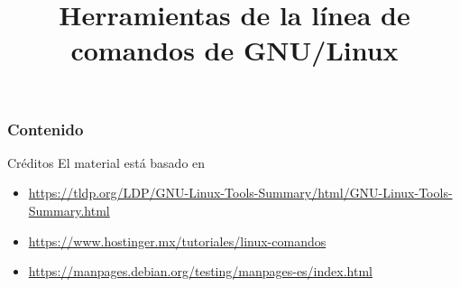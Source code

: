 \documentclass[aspectratio=169]{beamer}
\title[Línea de comandos de Linux]{Herramientas de la línea de comandos de GNU/Linux}
\newcommand{\nologo}{\setbeamertemplate{logo}{}} %
\newcommand{\nologo}{\setbeamertemplate{logo}{}} %
\begin{document}
{
\nologo
\begin{frame}
    \titlepage
\end{frame}
}

\begin{frame}
    \frametitle{Contenido}
    \tableofcontents
\end{frame}



\begin{frame}[c]{Créditos}
  El material está basado en
  \begin{itemize}
    \item \href{https://tldp.org/LDP/GNU-Linux-Tools-Summary/html/GNU-Linux-Tools-Summary.html}{https://tldp.org/LDP/GNU-Linux-Tools-Summary/html/GNU-Linux-Tools-Summary.html}
    \item \href{https://www.hostinger.mx/tutoriales/linux-comandos}{https://www.hostinger.mx/tutoriales/linux-comandos}
    \item \href{https://manpages.debian.org/testing/manpages-es/index.html}{https://manpages.debian.org/testing/manpages-es/index.html}
  \end{itemize}
\end{frame}
\end{document}
